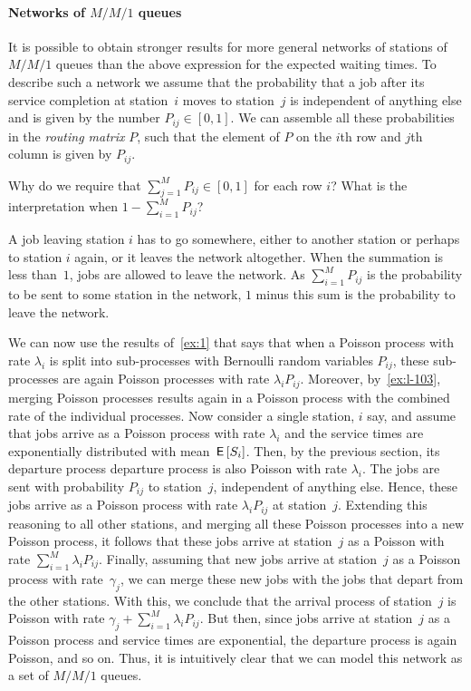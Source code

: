 \paragraph{Networks of $M/M/1$ queues}

It is possible to obtain stronger results for more general networks of stations of $M/M/1$ queues than the above expression for the expected waiting times.
To describe such a network we assume that the probability that a job after its service completion at station~$i$ moves to station~$j$ is independent of anything else and is given by the number $P_{i j}\in[0,1]$.
We can assemble all these probabilities in the \emph{routing matrix} $P$, such that the element of $P$ on the $i$th row and $j$th column is given by $P_{i j}$.

\begin{exercise}
Why do we require that $\sum_{j=1}^M P_{i j} \in [0, 1]$ for each row $i$? What is the interpretation when $1-\sum_{i=1}^M P_{i j}$? 
\begin{solution}
  A job leaving station $i$ has to go somewhere, either to another station or perhaps to station $i$ again, or it leaves the network altogether.
  When the summation is less than~$1$, jobs are allowed to leave the network.
  As $\sum_{i=1}^MP_{i j}$ is the probability to be sent to some station in the network, $1$ minus this sum is the probability to leave the network.
\end{solution}
\end{exercise}

We can now use the results of~\cref{ex:1} that says that when a Poisson process with rate $\lambda_i$ is split into sub-processes with Bernoulli random variables $P_{i j}$, these sub-processes are again Poisson processes with rate $\lambda_i P_{i j}$.
Moreover, by~\cref{ex:l-103}, merging Poisson processes results again in a Poisson process with the combined rate of the individual processes.
Now consider a single station, $i$ say, and assume that jobs arrive as a Poisson process with rate $\lambda_i$ and the service times are exponentially distributed with mean $\,\mathsf{E}\left[S_i\right]$.
Then, by the previous section, its departure process departure process is also Poisson with rate $\lambda_i$.
The jobs are sent with probability $P_{i j}$ to station~$j$, independent of anything else.
Hence, these jobs arrive as a Poisson process with rate $\lambda_i P_{i j}$ at station~$j$.
Extending this reasoning to all other stations, and merging all these Poisson processes into a new Poisson process, it follows that these jobs arrive at station~$j$ as a Poisson with rate $\sum_{i=1}^M \lambda_i P_{i j}$.
Finally, assuming that new jobs arrive at station~$j$ as a Poisson process with rate~$\gamma_j$, we can merge these new jobs with the jobs that depart from the other stations.
With this, we conclude that the arrival process of station~$j$ is Poisson with rate $\gamma_j + \sum_{i=1}^M \lambda_i P_{i j}$.
But then, since jobs arrive at station~$j$ as a Poisson process and service times are exponential, the departure process is again Poisson, and so on.
Thus, it is intuitively clear that we can model this network as a set of $M/M/1$ queues. 


